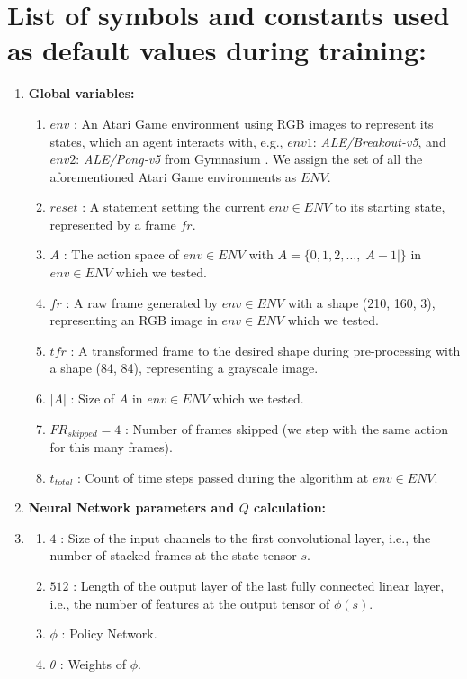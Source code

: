 \documentclass{article}
\begin{document}
\section{List of symbols and constants used as default values during training:}
\begin{enumerate}
    \item\textbf{Global variables:}
    \begin{enumerate}
        \item$env$ :  An Atari Game environment using RGB images to represent its states, which an agent interacts with, e.g., $env1$: \textit{ALE/Breakout-v5}, and $env2$: \textit{ALE/Pong-v5} from Gymnasium \cite{Gym}. We assign the set of all the aforementioned Atari Game environments as $ENV$.
        \item$reset$ : A statement setting the current $env \in ENV$ to its starting state, represented by a frame $fr$.
        \item$A$ : The action space of $env \in ENV$ with $A = \{0,1,2,\dots,|A-1|\}$ in $env \in ENV$ which we tested.
        \item$fr$ : A raw frame generated by $env \in ENV$ with a shape (210, 160, 3), representing an RGB image in $env \in ENV$ which we tested.
        \item$tfr$ : A transformed frame to the desired shape during pre-processing with a shape (84, 84), representing a grayscale image.
        \item$|A|$ : Size of $A$ in $env \in ENV$ which we tested.
        \item$FR_{skipped} = 4$ : Number of frames skipped (we step with the same action for this many frames).
        \item$t_{total}$ : Count of time steps passed during the algorithm at $env \in ENV$.
    \end{enumerate}
    \item\textbf{Neural Network parameters and $Q$ calculation:}
    \item\begin{enumerate}
        \item$4$ : Size of the input channels to the first convolutional layer, i.e., the number of stacked frames at the state tensor $s$.
        \item$512$ : Length of the output layer of the last fully connected linear layer, i.e., the number of features at the output tensor of $\phi(s)$.
        \item$\phi$ : Policy Network.
        \item$\theta$ : Weights of $\phi$.

\end{enumerate}
\end{enumerate}
\end{document}
